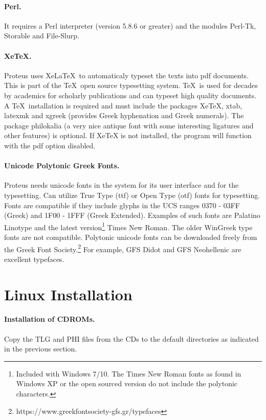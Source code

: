 \documentclass[11pt,a4paper]{article}
\begin{document}
  \paragraph{Perl.}
  It requires a Perl interpreter (version 5.8.6 or greater) and the
  modules Perl-Tk, Storable and File-Slurp.
  \paragraph{XeTeX.}
  Proteus uses XeLaTeX\ to automaticaly typeset the texts into pdf documents.
  This is part of the \TeX\ open source typesetting system. \TeX\ is used
  for decades by academics for scholarly publications and can typeset high
  quality documents. A \TeX\ installation is
  required and must include the packages XeTeX, xtab, latexmk and xgreek
  (provides Greek hyphenation and Greek numerals). The package philokalia
  (a very nice antique font with some interesting ligatures and other features)
  is optional.  If XeTeX is not
  installed, the program will function with the pdf option disabled.
  \paragraph{Unicode Polytonic Greek Fonts.}
    Proteus needs unicode fonts in the system for its user interface
    and for the typesetting.
    Can utilize True Type (ttf) or Open Type (otf) fonts for typesetting.
    Fonts are compatible if they include glyphs in the UCS ranges
    0370 - 03FF (Greek) and 1F00 - 1FFF (Greek Extended).
    Examples of such fonts are Palatino Linotype and the latest version\footnote{
                Included with Windows 7/10.
                The Times New Roman fonts as found
                in Windows XP or the open sourced version do not include the
                 polytonic characters.}
    Times New Roman.  The older WinGreek type fonts are not compatible.
    Polytonic unicode fonts can be downloaded freely
    from the Greek Font Society.\footnote{
                https://www.greekfontsociety-gfs.gr/typefaces
                }
    For example, GFS Didot and GFS Neohellenic are excellent typefaces.
\section{Linux Installation}

    \paragraph{Installation of CDROMs.}Copy the TLG and PHI files from the CDs
    to the default directories as indicated in the previous section.
\end{document}
